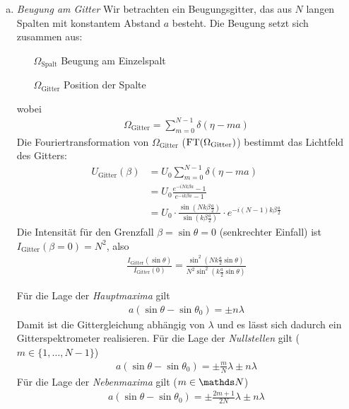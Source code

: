 \begin{enumerate}[a)]
\item \emph{Beugung am Gitter}
  Wir betrachten ein Beugungsgitter, das aus $N$ langen Spalten mit
  konstantem Abstand $a$ besteht.
  Die Beugung setzt sich zusammen aus:
  \begin{itemize}
  \item[$\Omega_\text{Spalt}$] Beugung am Einzelspalt
  \item[$\Omega_\text{Gitter}$] Position der Spalte
  \end{itemize}
  wobei
  \begin{align*}
    \Omega_\text{Gitter} = \sum_{m=0}^{N-1}\delta(\eta-ma)
  \end{align*}
  Die Fouriertransformation von $\Omega_\text{Gitter}$
  ($\operatorname{FT}(\Omega_\text{Gitter})$) bestimmt das Lichtfeld des Gitters:
  \begin{align*}
    U_\text{Gitter}(\beta) 
    &= U_0 \sum_{m=0}^{N-1} \delta(\eta-ma)\\
    &= U_0 \frac
      {e^{-iNk\beta a} - 1}
      {e^{-i k\beta a} - 1} \\
    &= U_0 \cdot \frac
      { \sin\left( Nk\beta\frac{a}{2} \right) }
      { \sin\left(  k\beta\frac{a}{2} \right) }
      \cdot e^{-i(N-1)k\beta\frac{a}{2}}
  \end{align*}
  Die Intensität für den Grenzfall $\beta=\sin\theta=0$ (senkrechter
  Einfall) ist
  $I_\text{Gitter}(\beta=0) = N^2$, also
  \begin{gather*}
    \frac{ I_\text{Gitter}(\sin\theta) }{ I_\text{Gitter}(0)}
    = \frac
    {    \sin^2\left( Nk\frac{a}{2} \sin\theta \right) }
    { N^2\sin^2\left(  k\frac{a}{2} \sin\theta \right) }
  \end{gather*}

  Für die Lage der \emph{Hauptmaxima} gilt
  \begin{gather*}
    a(\sin\theta-\sin\theta_0) = \pm n\lambda
  \end{gather*}
  Damit ist die Gittergleichung abhängig von $\lambda$ und es lässt sich
  dadurch ein Gitterspektrometer realisieren.
  Für die Lage der \emph{Nullstellen} gilt ($m\in\{1,\dotsc,N-1\}$)
  \begin{gather*}
    a(\sin\theta-\sin\theta_0) = \pm \frac{m}{N}\lambda \pm n\lambda
  \end{gather*}
  Für die Lage der \emph{Nebenmaxima} gilt ($m\in\N$)
  \begin{gather*}
    a(\sin\theta-\sin\theta_0) = \pm \frac{2m+1}{2N}\lambda \pm n\lambda
  \end{gather*}


\end{enumerate}
